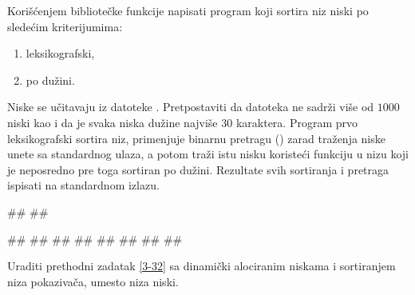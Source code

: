\begin{Answer}[ref=3-31]
\end{Answer}
\begin{Exercise}[label=3-32]
   Korišćenjem bibliotečke funkcije  napisati program
   koji sortira niz niski po sledećim kriterijumima:
   \begin{enumerate}
   \item leksikografski,
   \item po dužini.
   \end{enumerate}
   Niske se učitavaju iz datoteke . Pretpostaviti da datoteka ne sadrži više od 
   $1000$ niski kao i da je svaka niska dužine najviše $30$ karaktera. Program prvo
   leksikografski sortira niz, primenjuje binarnu pretragu
   () zarad traženja niske unete sa standardnog ulaza,
   a potom traži istu nisku koristeći funkciju  u nizu koji je neposredno pre toga
   sortiran po dužini. Rezultate svih sortiranja
   i pretraga ispisati na standardnom izlazu.

   
\begin{maxitest}
\begin{upotreba}{1}
##
##
  
#\naslovInt#
##
##
##
##
##
##
##
\end{upotreba}
\end{maxitest}
  
\end{Exercise}

\begin{Answer}[ref=3-32]
\end{Answer}
\begin{Exercise}[label=3-33]
  Uraditi prethodni zadatak \ref{3-32} sa dinamički alociranim niskama
  i sortiranjem niza pokazivača, umesto niza niski.
  
\end{Exercise}

